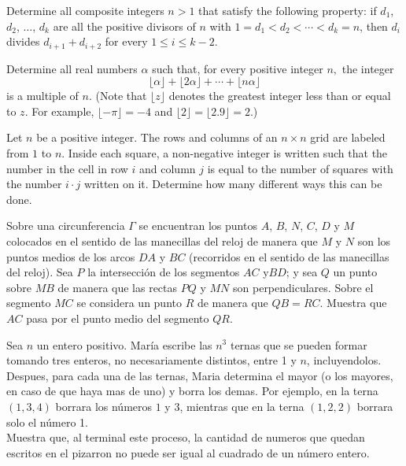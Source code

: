 \documentclass[11pt]{scrartcl}
\begin{document}
\begin{problem} %
    Determine all composite integers $n>1$ that satisfy the following property: if $d_1$, $d_2$, $\ldots$, $d_k$ are all the positive divisors of $n$ with $1 = d_1 < d_2 < \cdots < d_k = n$, then $d_i$ divides $d_{i+1} + d_{i+2}$ for every $1 \leq i \leq k - 2$.
\end{problem}

\begin{problem} %
    Determine all real numbers $\alpha$ such that, for every positive integer $n,$ the integer
$$\lfloor\alpha\rfloor +\lfloor 2\alpha\rfloor +\cdots +\lfloor n\alpha\rfloor$$is a multiple of $n.$ (Note that $\lfloor z\rfloor$ denotes the greatest integer less than or equal to $z.$ For example, $\lfloor -\pi\rfloor =-4$ and $\lfloor 2\rfloor= \lfloor 2.9\rfloor =2.$)
\end{problem}

\begin{problem} %
    Let $n$ be a positive integer. The rows and columns of an $n \times n$ grid are labeled from $1$ to $n$. Inside each square, a non-negative integer is written such that the number in the cell in row $i$ and column $j$ is equal to the number of squares with the number $i \cdot j$ written on it. Determine how many different ways this can be done.
\end{problem}

\begin{problem} %
Sobre una circunferencia $\Gamma$ se encuentran los puntos $A$, $B$, $N$, $C$, $D$ y $M$ colocados en el sentido de las manecillas del reloj de manera que $M$ y $N$ son los puntos medios de los arcos $DA$ y $BC$ (recorridos en el sentido de las manecillas del reloj). Sea $P$ la intersección de los segmentos $AC$ y$BD$; y sea $Q$ un punto sobre $MB$ de manera que las rectas $PQ$ y $MN$ son perpendiculares. Sobre el segmento $MC$ se considera un punto $R$ de manera que $QB = RC$. Muestra que $AC$ pasa por el punto medio del segmento $QR$.

\end{problem}

\begin{problem} %
 Sea $n$ un entero positivo. María escribe las $n^3$ ternas que se pueden formar tomando tres enteros, no necesariamente distintos, entre 1 y $n$, incluyendolos. Despues, para cada una de las ternas, Maria determina el mayor (o los mayores, en caso de que haya mas de uno) y borra los demas. Por ejemplo, en la terna $(1,3,4)$ borrara los números $1$ y $3$, mientras que en la terna $(1,2,2)$ borrara solo el número 1. \\
Muestra que, al terminal este proceso, la cantidad de numeros que quedan escritos en el pizarron no puede ser igual al cuadrado de un número entero.
\end{problem}
\end{document}
